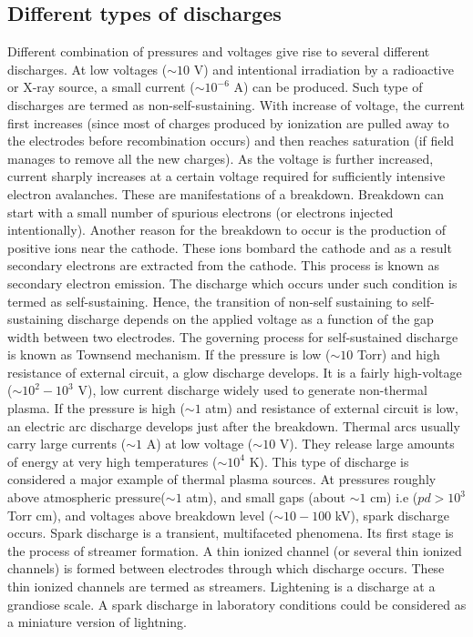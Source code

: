 \documentclass[paper=a4, fontsize=13pt]{scrartcl}
\begin{document}
\subsection{Different types of discharges}

Different combination of pressures and voltages give rise to several different discharges. At low voltages ($\sim10$ V) and intentional irradiation by a radioactive or X-ray source, a small current ($\sim10^{-6}$ A) can be produced. Such type of discharges are termed as non-self-sustaining. With increase of voltage, the current first increases (since most of charges produced by ionization are pulled away to the electrodes before recombination occurs) and then reaches saturation (if field manages to remove all the new charges). As the voltage is further increased, current sharply increases at a certain voltage required for sufficiently intensive electron avalanches. These are manifestations of a breakdown. Breakdown can start with a small number of spurious electrons (or electrons injected intentionally). Another reason for the breakdown to occur is the production of positive ions near the cathode. These ions bombard the cathode and as a result secondary electrons are extracted from the cathode. This process is known as secondary electron emission. The discharge which occurs under such condition is termed as self-sustaining. Hence, the transition of non-self sustaining to self-sustaining discharge depends on the applied voltage as a function of the gap width between two electrodes. The governing process for self-sustained discharge is known as Townsend mechanism. If the pressure is low ($\sim10$ Torr) and high resistance of external circuit, a glow discharge develops. It is a fairly high-voltage ($\sim10^2-10^3$ V), low current discharge widely used to generate non-thermal plasma. If the pressure is high ($\sim1$ atm) and resistance of external circuit is low, an electric arc discharge develops just after the breakdown. Thermal arcs usually carry large currents ($\sim1$ A) at low voltage ($\sim10$ V). They release large amounts of energy at very high temperatures ($\sim10^4$ K). This type of discharge is considered a major example of thermal plasma sources. At pressures roughly above atmospheric pressure($\sim1$ atm), and small gaps (about $\sim1$ cm) i.e ($pd > 10^3$ Torr cm), and voltages above breakdown level ($\sim10-100$ kV), spark discharge occurs. Spark discharge is a transient, multifaceted phenomena. Its first stage is the process of streamer formation. A thin ionized channel (or several thin ionized channels) is formed between electrodes through which discharge occurs. These thin ionized channels are termed as streamers. Lightening is a discharge at a grandiose scale. A spark discharge in laboratory conditions could be considered as a miniature version of lightning. 
\end{document}
